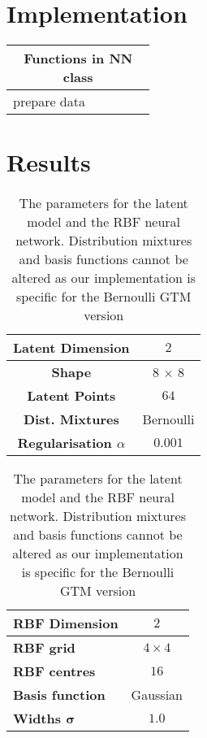 \chapter{Implementation}
\begin{table}[H]
	\centering
	\begin{tabular}{l p{0.35\linewidth}} \hline
	\multicolumn{2}{c}{{\large \textbf{Functions in NN class}}}
		\\ \hline  
		prepare data      &  \\ \hline
	\end{tabular}
\end{table}
\chapter{Results}

\begin{table}[H]
	\centering
	\begin{tabular}{|c|c|} \hline
		\textbf{Latent Dimension} & $2$ \\ \hline
		\textbf{Shape} & 8 $\times$ $8$ \\ \hline
		\textbf{Latent Points} &  $64$\\ \hline
		\textbf{Dist. Mixtures} &  Bernoulli\\ \hline \hline
		\textbf{Regularisation $\alpha$ } & $0.001$ \\ \hline
	\end{tabular}
	\hspace*{0.5cm}
	\begin{tabular}{|l|c|} \hline
		\textbf{RBF Dimension} & $2$ \\ \hline
		\textbf{RBF grid}  & $4\times4$ \\ \hline 
		\textbf{RBF centres} & $16$ \\ \hline
		\textbf{Basis function} & Gaussian \\ \hline
	    \textbf{Widths $\bm{\sigma}$} & $1.0$\\ \hline
	\end{tabular}
	\caption{The parameters for the latent model and the RBF neural network. Distribution mixtures and basis functions cannot be altered as our implementation is specific for the Bernoulli GTM version}
	\label{eval:model}
\end{table}




